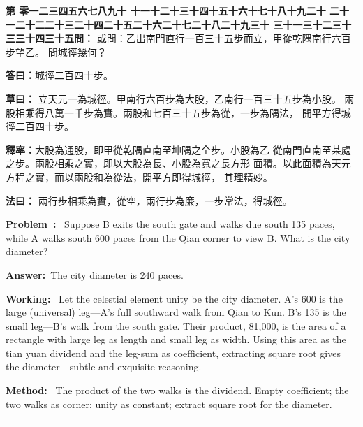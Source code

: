 \documentclass[9pt,a4paper]{article}
\newcounter{probnum}
\newcounter{overallnum}
\newcommand{\chnum}[1]{%
  \ifcase#1 零\or 一\or 二\or 三\or 四\or 五\or 六\or 七\or 八\or 九\or 十\or
    十一\or 十二\or 十三\or 十四\or 十五\or 十六\or 十七\or 十八\or 十九\or 二十\or
    二十一\or 二十二\or 二十三\or 二十四\or 二十五\or 二十六\or 二十七\or 二十八\or 二十九\or 三十\or
    三十一\or 三十二\or 三十三\or 三十四\or 三十五\fi}
\newcommand{\problem}[1]{\stepcounter{probnum}\stepcounter{overallnum}\par\noindent\textbf{\color{volcolor}第\chnum{\value{probnum}}問：}#1\par\vspace{0.15cm}}
\newcommand{\answer}[1]{\par\noindent\textbf{答曰：}#1\par\vspace{0.15cm}}
\newcommand{\working}[1]{\par\noindent\textbf{草曰：}#1\par\vspace{0.15cm}}
\newcommand{\method}[1]{\par\noindent\textbf{法曰：}#1\par\vspace{0.25cm}}
\newcommand{\eproblem}[1]{\par\noindent\textbf{\color{volcolor}Problem~\theoverallnum:}~#1\par\vspace{0.15cm}}
\newcommand{\eanswer}[1]{\par\noindent\textbf{Answer:}~#1\par\vspace{0.15cm}}
\newcommand{\eworking}[1]{\par\noindent\textbf{Working:}~#1\par\vspace{0.15cm}}
\newcommand{\emethod}[1]{\par\noindent\textbf{Method:}~#1\par\vspace{0.25cm}}
\begin{document}
\noindent\begin{minipage}[t]{0.48\textwidth}
\problem{
或問：乙出南門直行一百三十五步而立，甲從乾隅南行六百步望乙。
問城徑幾何？
}

\answer{城徑二百四十步。}

\working{
立天元一為城徑。甲南行六百步為大股，乙南行一百三十五步為小股。
兩股相乘得八萬一千步為實。兩股和七百三十五步為從，一步為隅法，
開平方得城徑二百四十步。

\textbf{釋率：}大股為通股，即甲從乾隅直南至坤隅之全步。小股為乙
從南門直南至某處之步。兩股相乘之實，即以大股為長、小股為寬之長方形
面積。以此面積為天元方程之實，而以兩股和為從法，開平方即得城徑，
其理精妙。
}

\method{
兩行步相乘為實，從空，兩行步為廉，一步常法，得城徑。
}
\end{minipage}%
\hfill%
\begin{minipage}[t]{0.50\textwidth}
\eproblem{
Suppose B exits the south gate and walks due south 135 paces, while A walks
south 600 paces from the Qian corner to view B. What is the city diameter?
}

\eanswer{The city diameter is 240 paces.}

\eworking{
Let the celestial element unity be the city diameter. A's 600 is the large
(universal) leg---A's full southward walk from Qian to Kun. B's 135 is the
small leg---B's walk from the south gate. Their product, 81,000, is the area
of a rectangle with large leg as length and small leg as width. Using this
area as the tian yuan dividend and the leg-sum as coefficient, extracting
square root gives the diameter---subtle and exquisite reasoning.
}

\emethod{
The product of the two walks is the dividend. Empty coefficient; the two
walks as corner; unity as constant; extract square root for the diameter.
}
\end{minipage}
\vspace{0.15cm}

\vspace{0.15cm}
\noindent\rule{\textwidth}{0.2pt}
\vspace{0.15cm}
\end{document}
